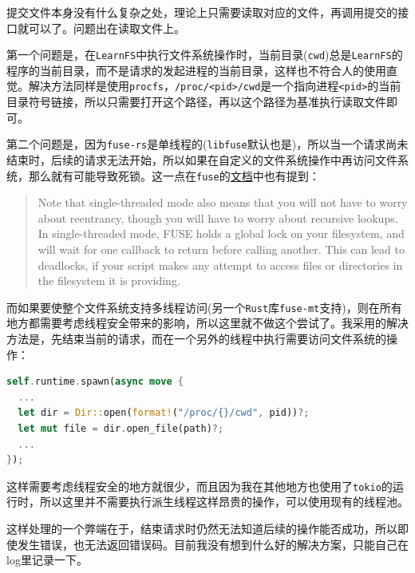 \documentclass[12pt, UTF8]{article}
\begin{document}
提交文件本身没有什么复杂之处，理论上只需要读取对应的文件，再调用提交的接口就可以了。问题出在读取文件上。

第一个问题是，在\lstinline|LearnFS|中执行文件系统操作时，当前目录(\lstinline|cwd|)总是\lstinline|LearnFS|的程序的当前目录，而不是请求的发起进程的当前目录，这样也不符合人的使用直觉。解决方法同样是使用\lstinline|procfs|，\lstinline|/proc/<pid>/cwd|是一个指向进程\lstinline|<pid>|的当前目录符号链接，所以只需要打开这个路径，再以这个路径为基准执行读取文件即可。

第二个问题是，因为\lstinline|fuse-rs|是单线程的(\lstinline|libfuse|默认也是)，所以当一个请求尚未结束时，后续的请求无法开始，所以如果在自定义的文件系统操作中再访问文件系统，那么就有可能导致死锁。这一点在\lstinline|fuse|的\href{https://linux.die.net/man/3/fuse}{文档}中也有提到：

\begin{quotation}
Note that single-threaded mode also means that you will not have to worry about reentrancy, though you will have to worry about recursive lookups. In single-threaded mode, FUSE holds a global lock on your filesystem, and will wait for one callback to return before calling another. This can lead to deadlocks, if your script makes any attempt to access files or directories in the filesystem it is providing.
\end{quotation}

而如果要使整个文件系统支持多线程访问(另一个\lstinline|Rust|库\lstinline|fuse-mt|支持)，则在所有地方都需要考虑线程安全带来的影响，所以这里就不做这个尝试了。我采用的解决方法是，先结束当前的请求，而在一个另外的线程中执行需要访问文件系统的操作：

\begin{lstlisting}[language = Rust]
self.runtime.spawn(async move {
  ...
  let dir = Dir::open(format!("/proc/{}/cwd", pid))?;
  let mut file = dir.open_file(path)?;
  ...
});
\end{lstlisting}

这样需要考虑线程安全的地方就很少，而且因为我在其他地方也使用了\lstinline|tokio|的运行时，所以这里并不需要执行派生线程这样昂贵的操作，可以使用现有的线程池。

这样处理的一个弊端在于，结束请求时仍然无法知道后续的操作能否成功，所以即使发生错误，也无法返回错误码。目前我没有想到什么好的解决方案，只能自己在log里记录一下。
\end{document}
